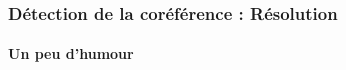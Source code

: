 \documentclass[xcolor=table]{beamer}
\begin{document}
%	
%	
%
%	
%	

\begin{frame}
	\frametitle{Détection de la coréférence : Résolution}
	\framesubtitle{Un peu d'humour}
	
	\begin{center}
	\end{center}
	
\end{frame}
\end{document}

